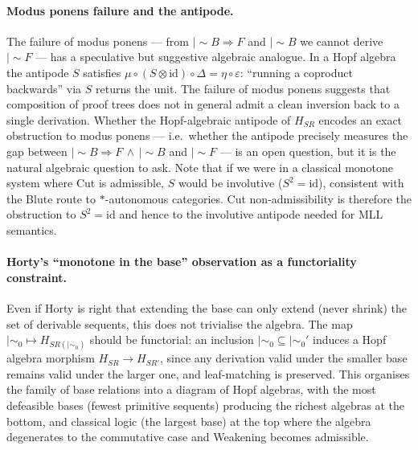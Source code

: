 \documentclass[a4paper,11pt]{report}
\newcommand{\ms}{\mathrel{\mid\!\sim}}
\newcommand{\mszero}{\mathrel{\mid\!\sim_{0}}}
\begin{document}
\paragraph{Modus ponens failure and the antipode.}
The failure of modus ponens --- from $\ms B \Rightarrow F$ and $\ms B$ we cannot derive
$\ms F$ --- has a speculative but suggestive algebraic analogue. In a Hopf algebra the
antipode $S$ satisfies $\mu \circ (S \otimes \mathrm{id}) \circ \Delta = \eta \circ
\varepsilon$: ``running a coproduct backwards'' via $S$ returns the unit. The failure of
modus ponens suggests that composition of proof trees does not in general admit a clean
inversion back to a single derivation. Whether the Hopf-algebraic antipode of $H_{SR}$
encodes an exact obstruction to modus ponens --- i.e.\ whether the antipode precisely
measures the gap between $\ms B \Rightarrow F \,\wedge\, \ms B$ and $\ms F$ --- is an
open question, but it is the natural algebraic question to ask. Note that if we were in a
classical monotone system where Cut is admissible, $S$ would be involutive ($S^2 =
\mathrm{id}$), consistent with the Blute route to $*$-autonomous categories. Cut
non-admissibility is therefore the obstruction to $S^2 = \mathrm{id}$ and hence to the
involutive antipode needed for MLL semantics.

\paragraph{Horty's ``monotone in the base'' observation as a functoriality constraint.}
Even if Horty is right that extending the base can only extend (never shrink) the set of
derivable sequents, this does not trivialise the algebra. The map $\mszero \mapsto
H_{SR(\mszero)}$ should be functorial: an inclusion $\mszero \subseteq \mszero'$ induces
a Hopf algebra morphism $H_{SR} \to H_{SR'}$, since any derivation valid under the
smaller base remains valid under the larger one, and leaf-matching is preserved. This
organises the family of base relations into a diagram of Hopf algebras, with the most
defeasible bases (fewest primitive sequents) producing the richest algebras at the bottom,
and classical logic (the largest base) at the top where the algebra degenerates to the
commutative case and Weakening becomes admissible.
\end{document}
